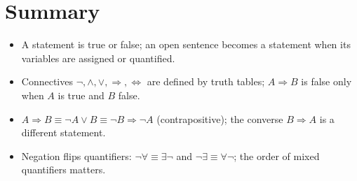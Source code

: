 \section{Summary}
\begin{itemize}
  \item A statement is true or false; an open sentence becomes a statement when its variables
        are assigned or quantified.
  \item Connectives $\neg,\wedge,\vee,\Rightarrow,\Leftrightarrow$ are defined by truth tables;
        $A \Rightarrow B$ is false only when $A$ is true and $B$ false.
  \item $A\Rightarrow B \equiv \neg A \vee B \equiv \neg B \Rightarrow \neg A$ (contrapositive);
        the converse $B \Rightarrow A$ is a different statement.
  \item Negation flips quantifiers: $\neg \forall \equiv \exists \neg$ and
        $\neg\exists \equiv \forall \neg$; the order of mixed quantifiers matters.
\end{itemize}

